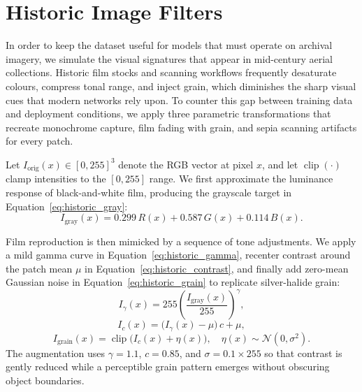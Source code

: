 \section{Historic Image Filters}
\label{subsec:historic_filters}

In order to keep the dataset useful for models that must operate on archival imagery, we simulate the visual signatures that appear in mid-century aerial collections. Historic film stocks and scanning workflows frequently desaturate colours, compress tonal range, and inject grain, which diminishes the sharp visual cues that modern networks rely upon. To counter this gap between training data and deployment conditions, we apply three parametric transformations that recreate monochrome capture, film fading with grain, and sepia scanning artifacts for every patch.

Let $I_{\text{orig}}(x) \in [0,255]^3$ denote the RGB vector at pixel $x$, and let $\operatorname{clip}(\cdot)$ clamp intensities to the $[0,255]$ range. We first approximate the luminance response of black-and-white film, producing the grayscale target in Equation~\ref{eq:historic_gray}:
\begin{equation}
I_{\text{gray}}(x) = 0.299\,R(x) + 0.587\,G(x) + 0.114\,B(x).
\label{eq:historic_gray}
\end{equation}

Film reproduction is then mimicked by a sequence of tone adjustments. We apply a mild gamma curve in Equation~\ref{eq:historic_gamma}, recenter contrast around the patch mean $\mu$ in Equation~\ref{eq:historic_contrast}, and finally add zero-mean Gaussian noise in Equation~\ref{eq:historic_grain} to replicate silver-halide grain:
\begin{equation}
I_{\gamma}(x) = 255\left( \frac{I_{\text{gray}}(x)}{255} \right)^{\gamma},
\label{eq:historic_gamma}
\end{equation}
\begin{equation}
I_{c}(x) = \big(I_{\gamma}(x) - \mu\big)\,c + \mu,
\label{eq:historic_contrast}
\end{equation}
\begin{equation}
I_{\text{grain}}(x) = \operatorname{clip}\big(I_{c}(x) + \eta(x)\big), \quad \eta(x) \sim \mathcal{N}(0, \sigma^2).
\label{eq:historic_grain}
\end{equation}
The augmentation uses $\gamma = 1.1$, $c = 0.85$, and $\sigma = 0.1\times 255$ so that contrast is gently reduced while a perceptible grain pattern emerges without obscuring object boundaries.

